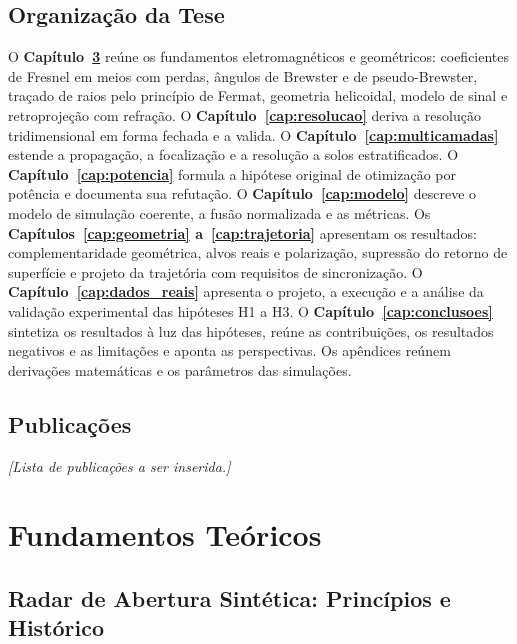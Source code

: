 \documentclass[12pt,a4paper,oneside]{book}
\theoremstyle{remark}
\theoremstyle{plain}
\theoremstyle{definition}
\begin{document}
\section{Organização da Tese}
\label{sec:intro_org}

O \textbf{Capítulo~\ref{cap:fundamentos}} reúne os fundamentos
eletromagnéticos e geométricos: coeficientes de Fresnel em meios com perdas,
ângulos de Brewster e de pseudo-Brewster, traçado de raios pelo princípio de
Fermat, geometria helicoidal, modelo de sinal e retroprojeção com refração. O
\textbf{Capítulo~\ref{cap:resolucao}} deriva a resolução tridimensional em
forma fechada e a valida. O \textbf{Capítulo~\ref{cap:multicamadas}} estende a
propagação, a focalização e a resolução a solos estratificados. O
\textbf{Capítulo~\ref{cap:potencia}} formula a hipótese original de
otimização por potência e documenta sua refutação. O
\textbf{Capítulo~\ref{cap:modelo}} descreve o modelo de simulação coerente, a
fusão normalizada e as métricas. Os \textbf{Capítulos~\ref{cap:geometria}
a~\ref{cap:trajetoria}} apresentam os resultados: complementaridade
geométrica, alvos reais e polarização, supressão do retorno de superfície e
projeto da trajetória com requisitos de sincronização. O
\textbf{Capítulo~\ref{cap:dados_reais}} apresenta o projeto, a execução e a
análise da validação experimental das hipóteses H1 a H3. O
\textbf{Capítulo~\ref{cap:conclusoes}} sintetiza os resultados à luz das
hipóteses, reúne as contribuições, os resultados negativos e as limitações e aponta
as perspectivas. Os apêndices reúnem
derivações matemáticas e os parâmetros das simulações.

\section{Publicações}
\label{sec:intro_pub}


\textit{[Lista de publicações a ser inserida.]}

\chapter{Fundamentos Teóricos}
\label{cap:fundamentos}

\section{Radar de Abertura Sintética: Princípios e Histórico}
\label{sec:fund_sar_intro}
\end{document}
